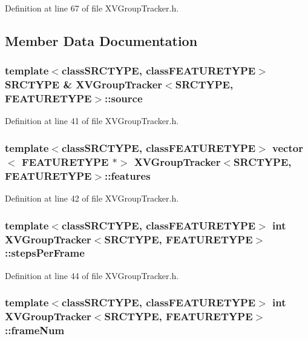 Definition at line 67 of file XVGroup\-Tracker.h.

\subsection{Member Data Documentation}
\label{XVGroupTracker_n0}
\hypertarget{class_XVGroupTracker_n0}{
\subsubsection[source]{\setlength{\rightskip}{0pt plus 5cm}template$<$classSRCTYPE, classFEATURETYPE$>$ SRCTYPE \& XVGroup\-Tracker$<$SRCTYPE, FEATURETYPE$>$::source}}




Definition at line 41 of file XVGroup\-Tracker.h.\label{XVGroupTracker_n1}
\hypertarget{class_XVGroupTracker_n1}{
\subsubsection[features]{\setlength{\rightskip}{0pt plus 5cm}template$<$classSRCTYPE, classFEATURETYPE$>$ vector$<$ FEATURETYPE $\ast$$>$ XVGroup\-Tracker$<$SRCTYPE, FEATURETYPE$>$::features}}




Definition at line 42 of file XVGroup\-Tracker.h.\label{XVGroupTracker_n2}
\hypertarget{class_XVGroupTracker_n2}{
\subsubsection[stepsPerFrame]{\setlength{\rightskip}{0pt plus 5cm}template$<$classSRCTYPE, classFEATURETYPE$>$ int XVGroup\-Tracker$<$SRCTYPE, FEATURETYPE$>$::steps\-Per\-Frame}}




Definition at line 44 of file XVGroup\-Tracker.h.\label{XVGroupTracker_n3}
\hypertarget{class_XVGroupTracker_n3}{
\subsubsection[frameNum]{\setlength{\rightskip}{0pt plus 5cm}template$<$classSRCTYPE, classFEATURETYPE$>$ int XVGroup\-Tracker$<$SRCTYPE, FEATURETYPE$>$::frame\-Num}}




